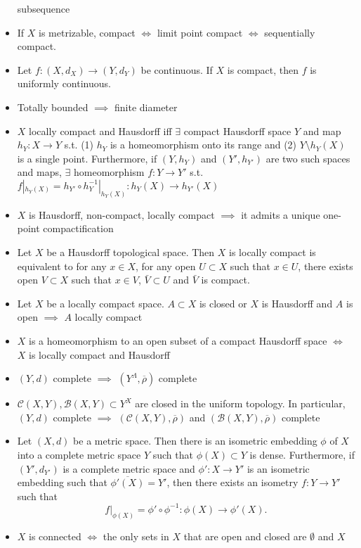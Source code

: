 \documentclass[frenchspacing,9pt,landscape,a4paper]{article}
\theoremstyle{remark}
\begin{document}
\begin{multicols}{4}
\begin{itemize}
    subsequence
\item If $X$ is metrizable, compact $\iff$ limit point compact $\iff$ sequentially compact.
\item Let $f:(X,d_X)\to(Y,d_Y)$ be continuous. If  $X$ is compact, then  $f$ is uniformly continuous.
\item Totally bounded $\implies$ finite diameter
\item $X$ locally compact and Hausdorff iff  $\exists$ compact Hausdorff space  $Y$ and map  $h_Y:X\to Y$
    s.t. (1)  $h_Y$ is a homeomorphism onto its range and (2)  $Y\setminus h_Y(X)$ is a single point.
    Furthermore, if $(Y,h_Y)$ and  $(Y',h_{Y'})$ are two such spaces and maps,  $\exists$ homeomorphism
    $f:Y\to Y'$ s.t.  $f|_{h_Y(X)} = h_{Y'} \circ h_Y^{-1}|_{h_Y(X)} : h_Y(X) \to h_{Y'}(X)$
\item $X$ is Hausdorff, non-compact, locally compact $\implies$ it admits a unique one-point
    compactification
\item Let $X$ be a Hausdorff topological space. Then $X$ is locally compact is equivalent to for any $x \in X$, for any open $U \subset X$ such that $x \in U$, there exists open $V \subset X$ such that $x \in V$, $\bar{V} \subset U$ and $\bar{V}$ is compact.
\item Let $X$ be a locally compact space. $A\subset X$ is closed or  $X$ is Hausdorff and  $A$ is open
    $\implies$  $A$ locally compact
\item  $X$ is a homeomorphism to an open subset of a compact Hausdorff space  $\iff$  $X$ is locally
    compact and Hausdorff
\item $(Y,d)$ complete  $\implies$  $(Y^\Lambda,\overline{\rho})$ complete   
\item $\mathcal{C}(X,Y),\mathcal{B}(X,Y)\subset Y^X$ are closed in the uniform topology. In particular,
    $(Y,d)$ complete  $\implies$  $(\mathcal{C}(X,Y),\overline{\rho})$ and
    $(\mathcal{B}(X,Y),\overline{\rho})$ complete
\item Let $(X,d)$ be a metric space. Then there is an isometric embedding $\phi$ of $X$ into a complete metric space $Y$ such that $\phi(X) \subset Y$ is dense. Furthermore, if $(Y',d_{Y'})$ is a complete metric space and $\phi': X \to Y'$ is an isometric embedding such that $\overline{\phi'(X)} = Y'$, then there exists an isometry $f: Y \to Y'$ such that
\[
f|_{\phi(X)} = \phi' \circ \phi^{-1}: \phi(X) \to \phi'(X).
\]
\item $X$ is connected  $\iff$ the only sets in  $X$ that are open and closed are  $\emptyset$ and  $X$

\end{itemize}
\end{multicols}
\end{document}
